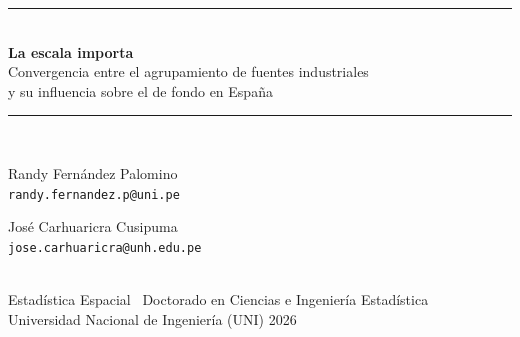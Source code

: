 \documentclass[11pt,aspectratio=169]{beamer}
\begin{document}
\begin{frame}[plain]
  \vfill
  \hspace*{8mm}\begin{minipage}{0.85\textwidth}
    {\color{azulc}\rule{\textwidth}{1.2pt}}\\[5mm]
    {\LARGE\color{azul}\bfseries La escala importa}\\[3mm]
    {\large Convergencia entre el agrupamiento de fuentes industriales\\
     y su influencia sobre el  de fondo en España}\\[8mm]
    {\color{azulc}\rule{\textwidth}{0.5pt}}\\[4mm]
    \begin{minipage}[t]{0.48\textwidth}
      Randy Fernández Palomino\\[0.5mm]
      {\footnotesize\color{gris}\texttt{randy.fernandez.p@uni.pe}}
    \end{minipage}%
    \begin{minipage}[t]{0.48\textwidth}
      José Carhuaricra Cusipuma\\[0.5mm]
      {\footnotesize\color{gris}\texttt{jose.carhuaricra@unh.edu.pe}}
    \end{minipage}\\[6mm]
    {\small\color{gris}Estadística Espacial \textperiodcentered\ Doctorado en
    Ciencias e Ingeniería Estadística}\\[1mm]
    {\small\color{gris}Universidad Nacional de Ingeniería (UNI)
    \hfill 2026}
  \end{minipage}
  \vfill
\end{frame}
\end{document}
